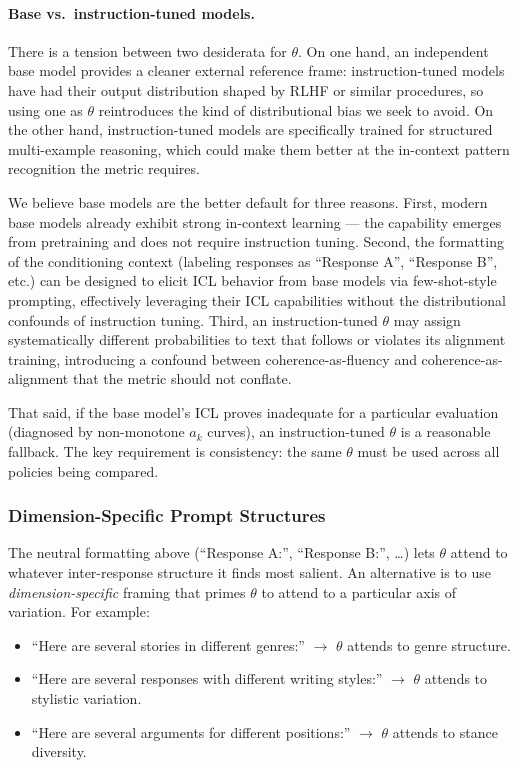\documentclass[11pt]{article}
\begin{document}
\paragraph{Base vs.\ instruction-tuned models.} There is a tension between two desiderata for $\theta$. On one hand, an independent base model provides a cleaner external reference frame: instruction-tuned models have had their output distribution shaped by RLHF or similar procedures, so using one as $\theta$ reintroduces the kind of distributional bias we seek to avoid. On the other hand, instruction-tuned models are specifically trained for structured multi-example reasoning, which could make them better at the in-context pattern recognition the metric requires.

We believe base models are the better default for three reasons. First, modern base models already exhibit strong in-context learning --- the capability emerges from pretraining and does not require instruction tuning. Second, the formatting of the conditioning context (labeling responses as ``Response A'', ``Response B'', etc.) can be designed to elicit ICL behavior from base models via few-shot-style prompting, effectively leveraging their ICL capabilities without the distributional confounds of instruction tuning. Third, an instruction-tuned $\theta$ may assign systematically different probabilities to text that follows or violates its alignment training, introducing a confound between coherence-as-fluency and coherence-as-alignment that the metric should not conflate.

That said, if the base model's ICL proves inadequate for a particular evaluation (diagnosed by non-monotone $a_k$ curves), an instruction-tuned $\theta$ is a reasonable fallback. The key requirement is consistency: the same $\theta$ must be used across all policies being compared.

\subsubsection{Dimension-Specific Prompt Structures}

The neutral formatting above (``Response A:'', ``Response B:'', \ldots) lets $\theta$ attend to whatever inter-response structure it finds most salient. An alternative is to use \emph{dimension-specific} framing that primes $\theta$ to attend to a particular axis of variation. For example:

\begin{itemize}[nosep]
    \item ``Here are several stories in different genres:'' $\to$ $\theta$ attends to genre structure.
    \item ``Here are several responses with different writing styles:'' $\to$ $\theta$ attends to stylistic variation.
    \item ``Here are several arguments for different positions:'' $\to$ $\theta$ attends to stance diversity.
\end{itemize}
\end{document}
